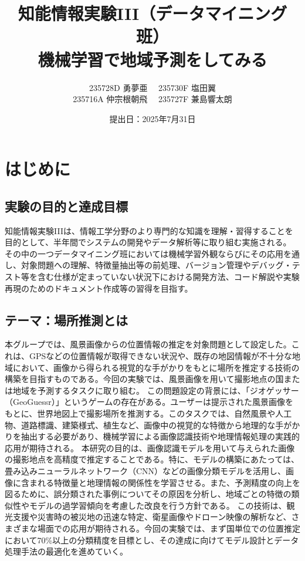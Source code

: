 \documentclass[a4paper, 11pt, titlepage]{jsarticle}
\title{知能情報実験III（データマイニング班）\\機械学習で地域予測をしてみる}
\author{235728D 勇夢亜
　235730F  塩田翼 \\
235716A 仲宗根朝飛
　235727F 兼島響太朗  \\
}
\date{提出日：2025年7月31日}
\begin{document}
\maketitle
\tableofcontents


\section{はじめに}

\subsection{実験の目的と達成目標}
知能情報実験IIIは、情報工学分野のより専門的な知識を理解・習得することを目的として、半年間でシステムの開発やデータ解析等に取り組む実施される。
その中の一つデータマイニング班においては機械学習外観ならびにその応用を通し、対象問題への理解、特徴量抽出等の前処理、バージョン管理やデバッグ・テスト等を含む仕様が定まっていない状況下における開発方法、コード解説や実験再現のためのドキュメント作成等の習得を目指す。

\subsection{テーマ：場所推測とは}

本グループでは、風景画像からの位置情報の推定を対象問題として設定した。これは、GPSなどの位置情報が取得できない状況や、既存の地図情報が不十分な地域において、画像から得られる視覚的な手がかりをもとに場所を推定する技術の構築を目指すものである。今回の実験では、風景画像を用いて撮影地点の国または地域を予測するタスクに取り組む。
この問題設定の背景には、「ジオゲッサー（GeoGuessr）」というゲームの存在がある\cite{geoguessr}。ユーザーは提示された風景画像をもとに、世界地図上で撮影場所を推測する。このタスクでは、自然風景や人工物、道路標識、建築様式、植生など、画像中の視覚的な特徴から地理的な手がかりを抽出する必要があり、機械学習による画像認識技術や地理情報処理の実践的応用が期待される。
本研究の目的は、画像認識モデルを用いて与えられた画像の撮影地点を高精度で推定することである。特に、モデルの構築にあたっては、畳み込みニューラルネットワーク（CNN）などの画像分類モデルを活用し、画像に含まれる特徴量と地理情報の関係性を学習させる。また、予測精度の向上を図るために、誤分類された事例についてその原因を分析し、地域ごとの特徴の類似性やモデルの過学習傾向を考慮した改良を行う方針である。
この技術は、観光支援や災害時の被災地の迅速な特定、衛星画像やドローン映像の解析など、さまざまな場面での応用が期待される。今回の実験では、まず国単位での位置推定において70\%以上の分類精度を目標とし、その達成に向けてモデル設計とデータ処理手法の最適化を進めていく。
\end{document}
